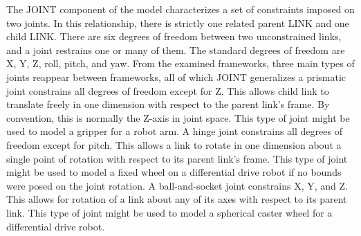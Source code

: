 The JOINT component of the model characterizes a set of constraints imposed on two joints. In this relationship, there is strictly one related parent LINK and one child LINK. There are six degrees of freedom between two unconstrained links, and a joint restrains one or many of them. The standard degrees of freedom are X, Y, Z, roll, pitch, and yaw. From the examined frameworks, three main types of joints reappear between frameworks, all of which JOINT generalizes a prismatic joint constrains all degrees of freedom except for Z. This allows child link to translate freely in one dimension with respect to the parent link's frame. By convention, this is normally the Z-axis in joint space. This type of joint might be used to model a gripper for a robot arm.
%
A hinge joint constrains all degrees of freedom except for pitch. This allows a link to rotate in one dimension about a single point of rotation with respect to its parent link's frame. This type of joint might be used to model a fixed wheel on a differential drive robot if no bounds were posed on the joint rotation.  A ball-and-socket joint constrains X, Y, and Z. This allows for rotation of a link about any of its axes with respect to its parent link. This type of joint might be used to model a spherical caster wheel for a differential drive robot.


